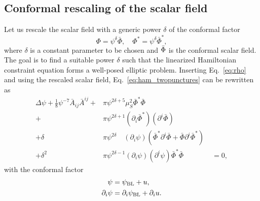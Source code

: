 \subsection{Conformal rescaling of the scalar field}
Let us rescale the scalar field with a generic power $\delta$ of the conformal factor
\begin{equation}
    \Phi = \psi^\delta \bar{\Phi},
    \quad
    \Phi^* = \psi^\delta \bar{\Phi}^*,
\end{equation}
where $\delta$ is a constant parameter to be chosen
and $\Bar{\Phi}$ is the conformal scalar field.
The goal is to find a suitable power $\delta$ such that the linearized Hamiltonian
constraint equation forms a well-posed elliptic problem.
Inserting Eq.~\eqref{eq:rho}
and using the rescaled scalar field, Eq.~\eqref{eq:ham_twopunctures} can be rewritten as
\begin{align}
    \Delta\psi
    + \frac{1}{8} \psi^{-7} \bar{A}_{ij} \bar{A}^{ij}
    +
    &\pi \psi^{2\delta + 5}
    \mu_S^2 \bar{\Phi}^* \bar{\Phi}
    \nonumber
    \\
    +
    &\pi \psi^{2\delta + 1}
    (\partial_i\bar{\Phi}^*)
    (\partial^i\bar{\Phi})
    \nonumber
    \\
    + \delta
    &\pi \psi^{2\delta}\quad
    (\partial_i\psi)
    ( \bar{\Phi}^* \partial^i\bar{\Phi}
    + \bar{\Phi} \partial^i\bar{\Phi}^* )
    \nonumber
    \\
    + \delta^2
    &\pi \psi^{2\delta-1} (\partial_i\psi) (\partial^i\psi)
    \bar{\Phi}^* \bar{\Phi}
    \quad\quad\quad\quad
    = 0,
    \label{eq:nonlin_ham_eq}
\end{align}
with the conformal factor
\begin{align}
    \psi 
    &= \psi_{\rm BL} + u,
    \\
    \partial_i\psi 
    &= \partial_i\psi_{\rm BL} + \partial_i u.
\end{align}


